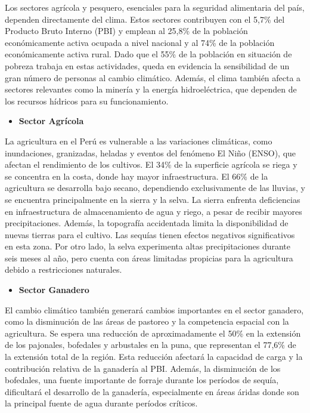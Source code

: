 \documentclass[
  stu,
  floatsintext,
  longtable,
  a4paper,
  nolmodern,
  notxfonts,
  notimes,
  12pt,
  colorlinks=true,linkcolor=blue,citecolor=blue,urlcolor=blue]{apa7}
\providecommand{\tightlist}{%
  \setlength{\itemsep}{0pt}\setlength{\parskip}{0pt}}
\begin{document}
Los sectores agrícola y pesquero, esenciales para la seguridad
alimentaria del país, dependen directamente del clima. Estos sectores
contribuyen con el 5,7\% del Producto Bruto Interno (PBI) y emplean al
25,8\% de la población económicamente activa ocupada a nivel nacional y
al 74\% de la población económicamente activa rural. Dado que el 55\% de
la población en situación de pobreza trabaja en estas actividades, queda
en evidencia la sensibilidad de un gran número de personas al cambio
climático. Además, el clima también afecta a sectores relevantes como la
minería y la energía hidroeléctrica, que dependen de los recursos
hídricos para su funcionamiento.

\begin{itemize}
\tightlist
\item
  \textbf{Sector Agrícola}
\end{itemize}

La agricultura en el Perú es vulnerable a las variaciones climáticas,
como inundaciones, granizadas, heladas y eventos del fenómeno El Niño
(ENSO), que afectan el rendimiento de los cultivos. El 34\% de la
superficie agrícola se riega y se concentra en la costa, donde hay mayor
infraestructura. El 66\% de la agricultura se desarrolla bajo secano,
dependiendo exclusivamente de las lluvias, y se encuentra principalmente
en la sierra y la selva. La sierra enfrenta deficiencias en
infraestructura de almacenamiento de agua y riego, a pesar de recibir
mayores precipitaciones. Además, la topografía accidentada limita la
disponibilidad de nuevas tierras para el cultivo. Las sequías tienen
efectos negativos significativos en esta zona. Por otro lado, la selva
experimenta altas precipitaciones durante seis meses al año, pero cuenta
con áreas limitadas propicias para la agricultura debido a restricciones
naturales.

\begin{itemize}
\tightlist
\item
  \textbf{Sector Ganadero}
\end{itemize}

El cambio climático también generará cambios importantes en el sector
ganadero, como la disminución de las áreas de pastoreo y la competencia
espacial con la agricultura. Se espera una reducción de aproximadamente
el 50\% en la extensión de los pajonales, bofedales y arbustales en la
puna, que representan el 77,6\% de la extensión total de la región. Esta
reducción afectará la capacidad de carga y la contribución relativa de
la ganadería al PBI. Además, la disminución de los bofedales, una fuente
importante de forraje durante los períodos de sequía, dificultará el
desarrollo de la ganadería, especialmente en áreas áridas donde son la
principal fuente de agua durante períodos críticos.
\end{document}
